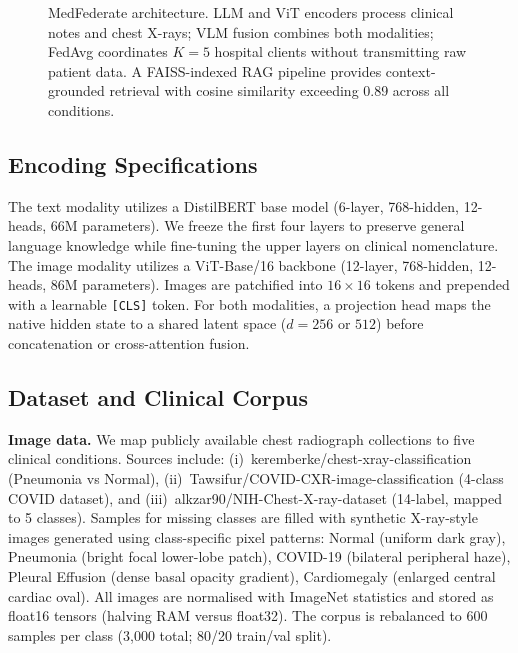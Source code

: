 \documentclass[conference]{IEEEtran}
\begin{document}
\begin{figure}[t]
{%
}
\caption{MedFederate architecture. LLM and ViT encoders process clinical
notes and chest X-rays; VLM fusion combines both modalities; FedAvg
coordinates $K{=}5$ hospital clients without transmitting raw patient data. A FAISS-indexed RAG pipeline provides context-grounded retrieval with cosine similarity exceeding 0.89 across all conditions.}
\label{fig:arch}
\end{figure}



\subsection{Encoding Specifications}
The text modality utilizes a DistilBERT base model (6-layer, 768-hidden, 12-heads, 66M parameters). We freeze the first four layers to preserve general language knowledge while fine-tuning the upper layers on clinical nomenclature. The image modality utilizes a ViT-Base/16 backbone (12-layer, 768-hidden, 12-heads, 86M parameters). Images are patchified into $16{\times}16$ tokens and prepended with a learnable \texttt{[CLS]} token. For both modalities, a projection head maps the native hidden state to a shared latent space ($d=256$ or $512$) before concatenation or cross-attention fusion.

\subsection{Dataset and Clinical Corpus}

\textbf{Image data.}
We map publicly available chest radiograph collections to five clinical
conditions. Sources include: (i)~keremberke/chest-xray-classification
(Pneumonia vs Normal), (ii)~Tawsifur/COVID-CXR-image-classification
(4-class COVID dataset), and (iii)~alkzar90/NIH-Chest-X-ray-dataset
(14-label, mapped to 5 classes). Samples for missing classes are filled with
synthetic X-ray-style images generated using class-specific pixel patterns:
Normal (uniform dark gray), Pneumonia (bright focal lower-lobe patch),
COVID-19 (bilateral peripheral haze), Pleural Effusion (dense basal
opacity gradient), Cardiomegaly (enlarged central cardiac oval).
All images are normalised with ImageNet statistics and stored as
float16 tensors (halving RAM versus float32). The corpus is rebalanced
to 600 samples per class (3{,}000 total; 80/20 train/val split).
\end{document}
